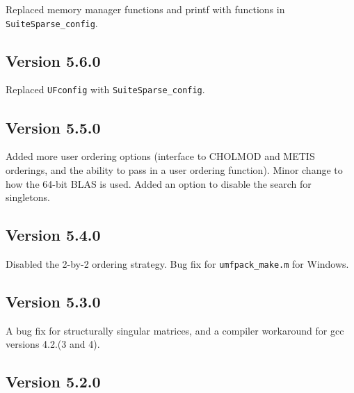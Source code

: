 \documentclass[11pt]{article}
\begin{document}
Replaced memory manager functions and printf with functions
in {\tt SuiteSparse\_config}.

\subsection{Version 5.6.0}

Replaced {\tt UFconfig} with {\tt SuiteSparse\_config}.

\subsection{Version 5.5.0}

Added more user ordering options (interface to CHOLMOD and METIS orderings,
and the ability to pass in a user ordering function).
Minor change to how the 64-bit BLAS is used.
Added an option to disable the search for singletons.

\subsection{Version 5.4.0}

Disabled the 2-by-2 ordering strategy.
Bug fix for \verb'umfpack_make.m' for Windows.

\subsection{Version 5.3.0}

A bug fix for structurally singular matrices, and a compiler workaround for
gcc versions 4.2.(3 and 4).

\subsection{Version 5.2.0}
\end{document}
